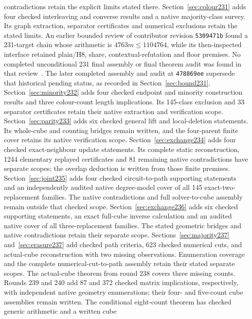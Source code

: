 \documentclass[11pt,a4paper]{article}
\theoremstyle{definition}
\theoremstyle{remark}
\begin{document}
contradictions retain the explicit limits stated there.
Section~\ref{sec:colour231} adds four checked interleaving and converse
results and a native majority-class survey. Its graph extraction,
separator certificates and numerical exclusions retain the stated limits.
An earlier bounded review of contributor revision \texttt{5309471b}
found a 231-target chain whose arithmetic is $4763m\le1104764$, while its
then-inspected interface retained plain/H8, share, contextual-refutation
and floor premises. No completed unconditional 231 final assembly or
final theorem audit was found in that review~\cite{research231}. The later
completed assembly and audit at \texttt{478869ee} supersede that historical
pending status, as recorded in Section~\ref{sec:bound231}.
Section~\ref{sec:minority232} adds four checked endpoint and minority
construction results and three colour-count length implications.
Its 145-class exclusion and 33 separator
certificates retain their native extraction and verification scope.
Section~\ref{sec:parity233} adds six checked general lift and local-deletion
statements. Its whole-cube and counting bridges remain written, and
the four-parent finite cover retains its native verification scope.
Section~\ref{sec:exchange234} adds four checked exact-neighbour update
statements. Its complete static reconstruction, 1244 elementary replayed
certificates and 81 remaining native contradictions have separate scopes;
the overlap deduction is written from those finite premises.
Section~\ref{sec:joint235} adds four checked circuit-to-path supporting
statements and an independently audited native degree-model cover of all
145 exact-two-replacement families. The native contradictions and full
solver-to-cube assembly remain outside that checked scope.
Section~\ref{sec:exchange236} adds six checked supporting statements,
an exact full-cube inverse calculation and an audited native cover of
all three-replacement families. The stated geometric bridges and native
contradictions retain their separate scope.
Sections~\ref{sec:majority237} and~\ref{sec:erasure237} add checked path
criteria, 623 checked numerical cuts, and actual-cube reconstruction with
two missing observations. Enumeration coverage and the complete
numerical-cut-to-path assembly retain their stated separate scopes.
The actual-cube theorem from round 238 covers three missing counts.
Rounds 239 and 240 add 87 and 372 checked matrix implications,
respectively, with independent native geometry enumerations; their
four- and five-count cube assemblies remain written. The conditional
eight-count theorem has checked generic arithmetic and a written cube
\end{document}
